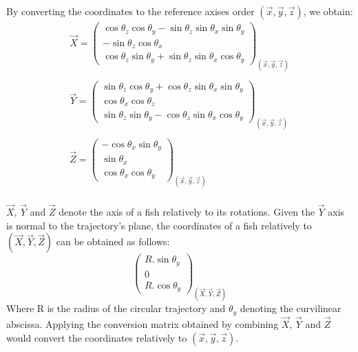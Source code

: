 By converting the coordinates to the reference axises order $(\overrightarrow{x}, \overrightarrow{y}, \overrightarrow{z})$, we obtain:\\

\[
\begin{array}{lllll}
\overrightarrow{X} = \begin{pmatrix}
\cos{\theta_{z}}  \cos{\theta_{y}} - \sin{\theta_{z}}  \sin{\theta_{x}}  \sin{\theta_{y}}\\
-\sin{\theta_{z}}  \cos{\theta_{x}} \\
\cos{\theta_{z}}  \sin{\theta_{y}} + \sin{\theta_{z}}  \sin{\theta_{x}}  \cos{\theta_{y}}
\end{pmatrix}_{(\overrightarrow{x}, \overrightarrow{y}, \overrightarrow{z})}\\ \\

\overrightarrow{Y} = \begin{pmatrix}
\sin{\theta_{z}}  \cos{\theta_{y}} + \cos{\theta_{z}}  \sin{\theta_{x}}  \sin{\theta_{y}}\\
\cos{\theta_{x}}  \cos{\theta_{z}} \\
\sin{\theta_{z}}  \sin{\theta_{y}} - \cos{\theta_{z}}  \sin{\theta_{x}}  \cos{\theta_{y}}
\end{pmatrix}_{(\overrightarrow{x}, \overrightarrow{y}, \overrightarrow{z})}\\ \\

\overrightarrow{Z} = \begin{pmatrix}
-\cos{\theta_{x}}  \sin{\theta_{y}}\\
\sin{\theta_{x}}\\
\cos{\theta_{x}}  \cos{\theta_{y}}
\end{pmatrix}_{(\overrightarrow{x}, \overrightarrow{y}, \overrightarrow{z})}
\end{array}
\]\\

$\overrightarrow{X}$, $\overrightarrow{Y}$ and $\overrightarrow{Z}$ denote the axis of a fish relatively to its rotations. Given the $\overrightarrow{Y}$ axis is normal to the trajectory's plane, the coordinates of a fish relatively to $(\overrightarrow{X}, \overrightarrow{Y}, \overrightarrow{Z})$ can be obtained as follows:
\[
\begin{pmatrix}
R . \sin{\theta_{y}} \\
0 \\
R . \cos{\theta_{y}}
\end{pmatrix}_{(\overrightarrow{X}, \overrightarrow{Y}, \overrightarrow{Z})}
\]
Where R is the radius of the circular trajectory and $\theta_{y}$ denoting the curvilinear abscissa. Applying the conversion matrix obtained by combining $\overrightarrow{X}$, $\overrightarrow{Y}$ and $\overrightarrow{Z}$ would convert the coordinates relatively to $(\overrightarrow{x}, \overrightarrow{y}, \overrightarrow{z})$.\\

